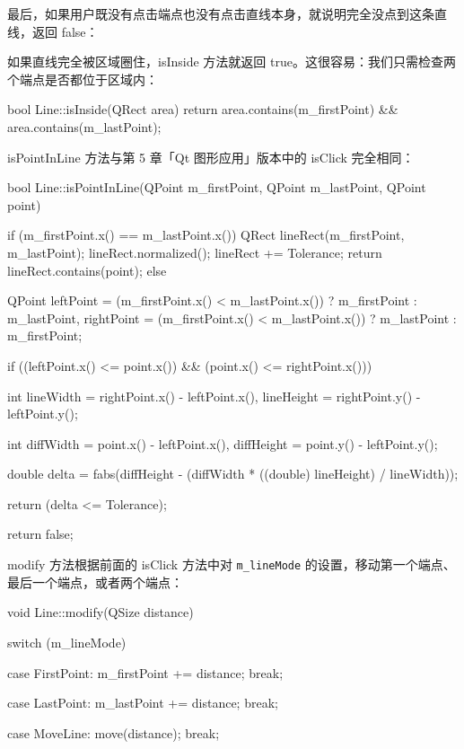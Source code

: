 最后，如果用户既没有点击端点也没有点击直线本身，就说明完全没点到这条直线，返回 false：

\begin{codebox}
  return false;
}
\end{codebox}

如果直线完全被区域圈住，isInside 方法就返回 true。这很容易：我们只需检查两个端点是否都位于区域内：

\begin{codebox}
bool Line::isInside(QRect area) {
 return area.contains(m_firstPoint) &&
   area.contains(m_lastPoint);
}
\end{codebox}

isPointInLine 方法与第 5 章「Qt 图形应用」版本中的 isClick 完全相同：

\begin{codebox}
bool Line::isPointInLine(QPoint m_firstPoint, QPoint m_lastPoint,
                         QPoint point) {
  if (m_firstPoint.x() == m_lastPoint.x()) {
    QRect lineRect(m_firstPoint, m_lastPoint);
    lineRect.normalized();
    lineRect += Tolerance;
    return lineRect.contains(point);
  }
  else {
    QPoint leftPoint = (m_firstPoint.x() < m_lastPoint.x())
                       ? m_firstPoint : m_lastPoint,
           rightPoint = (m_firstPoint.x() < m_lastPoint.x())
                        ? m_lastPoint : m_firstPoint;

    if ((leftPoint.x() <= point.x()) &&
        (point.x() <= rightPoint.x())) {
      int lineWidth = rightPoint.x() - leftPoint.x(),
          lineHeight = rightPoint.y() - leftPoint.y();

      int diffWidth = point.x() - leftPoint.x(),
          diffHeight = point.y() - leftPoint.y();

      double delta = fabs(diffHeight -
               (diffWidth * ((double) lineHeight) / lineWidth));

      return (delta <= Tolerance);
    }

    return false;
  }
}
\end{codebox}

modify 方法根据前面的 isClick 方法中对 \texttt{m\_lineMode} 的设置，移动第一个端点、最后一个端点，或者两个端点：

\begin{codebox}
void Line::modify(QSize distance) {
  switch (m_lineMode) {
    case FirstPoint:
    m_firstPoint += distance;
    break;

    case LastPoint:
    m_lastPoint += distance;
    break;

    case MoveLine:
    move(distance);
    break;
  }
}
\end{codebox}

